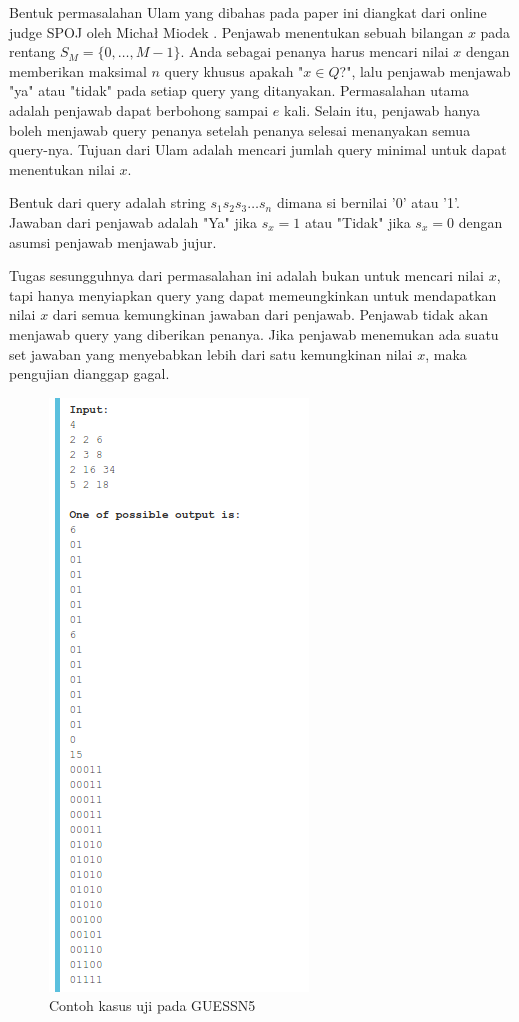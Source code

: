 Bentuk permasalahan Ulam yang dibahas pada paper ini diangkat dari online judge SPOJ oleh Micha\l{} Miodek \cite{guessn5}. Penjawab menentukan sebuah bilangan $x$ pada rentang $S_M=\{0,\ldots,M-1\}$. Anda sebagai penanya harus mencari nilai $x$ dengan memberikan maksimal $n$ query khusus apakah "$x \in Q$?", lalu penjawab menjawab "ya" atau "tidak" pada setiap query yang ditanyakan. Permasalahan utama adalah penjawab dapat berbohong sampai $e$ kali. Selain itu, penjawab hanya boleh menjawab query penanya setelah penanya selesai menanyakan semua query-nya. Tujuan dari Ulam adalah mencari jumlah query minimal untuk dapat menentukan nilai $x$.

Bentuk dari query adalah string $s_1s_2s_3\ldots s_n$ dimana si bernilai '0' atau '1'. Jawaban dari penjawab adalah "Ya" jika $s_x=1$ atau "Tidak" jika $s_x=0$ dengan asumsi penjawab menjawab jujur.

Tugas sesungguhnya dari permasalahan ini adalah bukan untuk mencari nilai $x$, tapi hanya menyiapkan query yang dapat memeungkinkan untuk mendapatkan nilai $x$ dari semua kemungkinan jawaban dari penjawab. Penjawab tidak akan menjawab query yang diberikan penanya. Jika penjawab menemukan ada suatu set jawaban yang menyebabkan lebih dari satu kemungkinan nilai $x$, maka pengujian dianggap gagal.

\begin{figure}
\centering
\includegraphics[scale=0.43]{../img/example.png}
\caption{Contoh kasus uji pada GUESSN5}
\label{fig:guessn5_test_case}
\end{figure}

